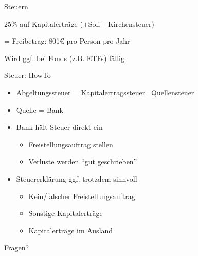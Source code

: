 \documentclass{beamer}
\begin{document}
		\begin{frame}{Steuern}
			\begin{description}[labelwidth=0cm, align=right]
				\item[Kapitalertragssteuer] 25\% auf Kapitalerträge (+Soli +Kirchensteuer)
				\item[Sparerpauschbetrag] = Freibetrag: 801€ pro Person pro Jahr
				\item[Vorabpauschale] Wird ggf. bei Fonds (z.B. ETFs) fällig
			\end{description}
		\end{frame}
	
		\begin{frame}{Steuer: HowTo}
			\begin{itemize}
				\item Abgeltungssteuer = Kapitalertragssteuer \textrightarrow\ Quellensteuer
				\item Quelle = Bank\pause
				\item Bank hält Steuer direkt ein
				\begin{itemize}
					\item Freistellungsauftrag stellen
					\item Verluste werden "`gut geschrieben"'
				\end{itemize}\pause
				\item Steuererklärung ggf. trotzdem sinnvoll
				\begin{itemize}
					\item Kein/falscher Freistellungsauftrag
					\item Sonstige Kapitalerträge
					\item Kapitalerträge im Ausland
				\end{itemize}
			\end{itemize}
		\end{frame}
	
	{
		\begin{frame}[plain]
			\begin{center}
				\vspace{1.5cm}
				Fragen?
			\end{center}
		\end{frame}
	}
\end{document}
